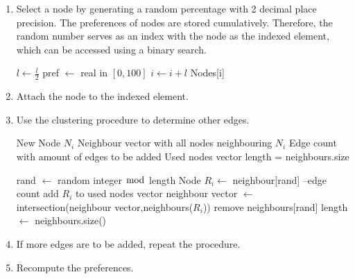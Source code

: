\documentclass[a4paper,11pt,titlepage]{article}
\begin{document}
\begin{enumerate}
  \item
    Select a node by generating a random percentage with 2 decimal place
    precision.  The preferences of nodes are stored cumulatively. Therefore, the
    random number serves as an index with the node as the indexed element, which
    can be accessed using a binary search.

    \begin{algorithmic}
	        \STATE $l \gets \frac{l}{2}$
		        \STATE pref $\gets$ real in  $[0,100]$
		          \STATE $i \gets i+l$
		        \ENDIF
	        \ENDIF
	      \ENDWHILE
      \ENDFOR
      \RETURN Nodes[i]
    \end{algorithmic}

   \item
     Attach the node to the indexed element.

   \item
     Use the clustering procedure to determine other edges.

     \begin{algorithmic}
       \REQUIRE New Node $N_i$
       \REQUIRE Neighbour vector with all nodes neighbouring $N_i$
       \REQUIRE Edge count with amount of edges to be added
       \REQUIRE Used nodes vector
       \STATE length = neighbours.size

	       \STATE rand $\gets$ random integer $\bmod$ length
	       \STATE Node $R_i \gets$ neighbour[rand]
		       \STATE --edge count
		       \STATE add $R_i$ to used nodes vector
		       \STATE neighbour vector $\gets$ intersection(neighbour vector,neighbours($R_i$))
	       \ELSE
		       \STATE remove neighbours[rand]
	       \ENDIF
	       \STATE length $\gets$ neighbours.size()
       \ENDWHILE
     \end{algorithmic}

   \item
     If more edges are to be added, repeat the procedure.

   \item
     Recompute the preferences.
\end{enumerate}
\end{document}
